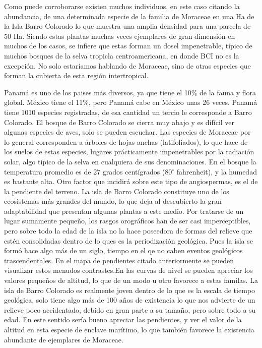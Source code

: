 \documentclass[11pt,]{article}
\begin{document}
Como puede corroborarse existen muchos individuos, en este caso citando
la abundancia, de una determinada especie de la familia de Moraceae en
una Ha de la Isla Barro Colorado lo que muestra una amplia densidad para
una parcela de 50 Ha. Siendo estas plantas muchas veces ejemplares de
gran dimensión en muchos de los casos, se infiere que estas forman un
dosel impenetrable, típico de muchos bosques de la selva tropicla
centroamericana, en donde BCI no es la excepción. No solo estaríamos
hablando de Moraceae, sino de otras especies que forman la cubierta de
esta región intertropical.

Panamá es uno de los paises más diversos, ya que tiene el 10\% de la
fauna y flora global. México tiene el 11\%, pero Panamá cabe en México
unas 26 veces. Panamá tiene 1010 especies registradas, de esa cantidad
un tercio le corresponde a Barro Colorado. El bosque de Barro Colorado
se cierra muy abajo y es difícil ver algunas especies de aves, solo se
pueden escuchar. Las especies de Moraceae por lo general corresponden a
árboles de hojas anchas (latifoliados), lo que hace de los suelos de
estas especies, lugares prácticamente impenetrables por la radiación
solar, algo típico de la selva en cualquiera de sus denominaciones. En
el bosque la temperatura promedio es de 27 grados centígrados
(80\(^\circ\) fahrenheit), y la humedad es bastante alta. Otro factor
que incidirá sobre este tipo de angiospermas, es el de la pendiente del
terreno. La isla de Barro Colorado constituye uno de los ecosistemas más
grandes del mundo, lo que deja al descubierto la gran adaptabilidad que
presentan algunas plantas a este medio. Por tratarse de un lugar
sumamente pequeño, los rasgos orográficos han de ser casi
imperceptibles, pero sobre todo la edad de la isla no la hace poseedora
de formas del relieve que estén consolidadas dentro de lo ques es la
periodización geológica. Pues la isla se formó hace algo más de un
siglo, tiempo en el qe no caben eventos geológicos trascendentales. En
el mapa de pendientes citado anteriormente se pueden visualizar estos
menudos contrastes.En las curvas de nivel se pueden apreciar los valores
pequeños de altitud, lo que de un modo u otro favorece a estas familas.
La isla de Barro Colorado es realmente joven dentro de lo que es la
escala de tiempo geológica, solo tiene algo más de 100 años de
existencia lo que nos advierte de un relieve poco accidentado, debido en
gran parte a su tamaño, pero sobre todo a su edad. En este sentido sería
bueno apreciar las pendientes, y ver el valor de la altitud en esta
especie de enclave marítimo, lo que también favorece la existencia
abundante de ejemplares de Moraceae.
\end{document}
